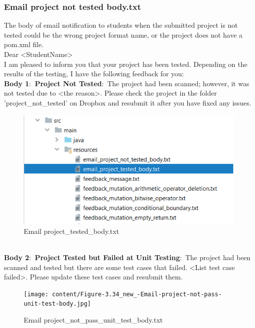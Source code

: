 \newpage
\subsubsection{Email project not tested body.txt}
The body of email notification to students when the submitted project is not tested could be the wrong project format name, or the project does not have a pom.xml file.\\


Dear <StudentName>\\
I am pleased to inform you that your project has been tested. Depending on the results of the testing, I have the following feedback for you:\\

\textbf{Body 1$:$ Project Not Tested$:$} The project had been scanned; however, it was not tested due to <the reason>. Please check the project in the folder 'project\_not\_tested' on Dropbox and resubmit it after you have fixed any issues. \\
\newpage
\begin{figure}[h!]
	\centering
	\includegraphics[scale=1.3]{fig37.png}
	\caption{Email project\_tested\_body.txt}
	\label{fig:f11}
\end{figure}\\
\textbf{Body 2$:$ Project Tested but Failed at Unit Testing$:$} The project had been scanned and tested but there are some test cases that failed. <List test case failed>. Please update these test cases and resubmit them. \\
\begin{figure}[h!]
	\centering
	\texttt{[image: content/Figure-3.34\_new\_-Email-project-not-pass-unit-test-body.jpg]}
	\caption{Email project\_not\_pass\_unit\_test\_body.txt}
	\label{fig:f11}
\end{figure}\\
